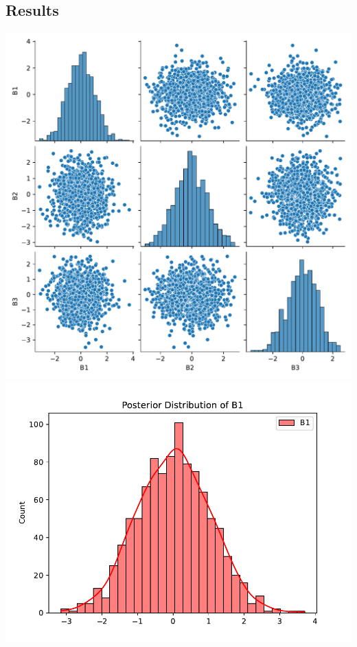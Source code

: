 \documentclass{article}
\begin{document}
\subsection{Results}
\includegraphics[width=\textwidth]{snsPosteriors.pdf}
\includegraphics[width=\textwidth]{snsSingle_1.pdf}
\end{document}

